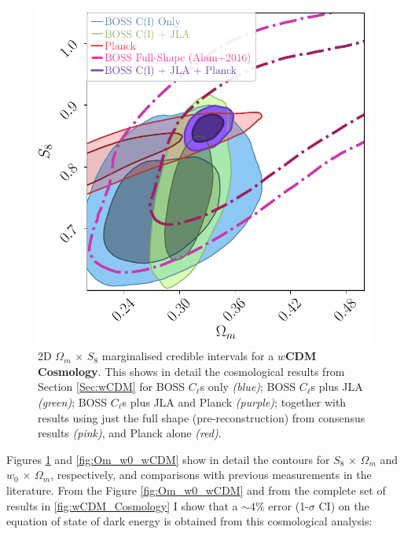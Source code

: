 \begin{figure}
\begin{center}
\includegraphics[scale=0.70]{BOSS-FIGS/Om_S8_wCDM.pdf}
\caption[2D $\Omega_m \, \times \, S_8$ marginalised credible intervals for a $w$CDM Cosmology.]{2D $\Omega_m \, \times \, S_8$ marginalised credible intervals for a \textbf{$w$CDM Cosmology}. This shows in detail the cosmological results from Section \ref{Sec:wCDM} for BOSS $C_{\ell}$s only \textit{(blue)}; BOSS $C_{\ell}$s plus JLA \textit{(green)}; BOSS $C_{\ell}$s plus JLA and Planck \textit{(purple)}; together with results using just the full shape (pre-reconstruction) from \protect\cite{2016BOSSCosmology} consensus results \textit{(pink)}, and Planck alone \textit{(red)}.}
\label{fig:Om_S8_wCDM}
\end{center}
\end{figure}

\qquad Figures \ref{fig:Om_S8_wCDM} and \ref{fig:Om_w0_wCDM} show in detail the contours for $S_8 \, \times \, \Omega_m$ and $w_0 \, \times \, \Omega_m$, respectively, and comparisons with previous measurements in the literature. From the Figure \ref{fig:Om_w0_wCDM} and from the complete set of results in \ref{fig:wCDM_Cosmology} I show that a $\sim 4\%$ error (1-$\sigma$ CI) on the equation of state of dark energy is obtained from this cosmological analysis:

